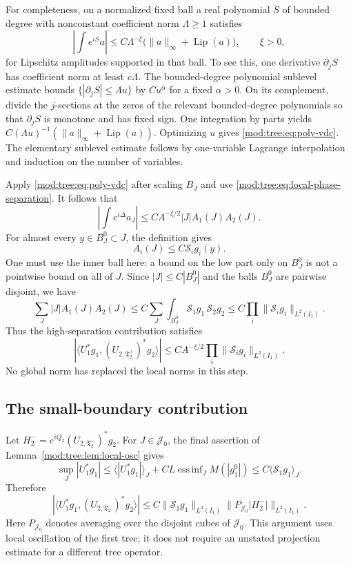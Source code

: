 \documentclass[11pt]{article}
\numberwithin{equation}{section}
\theoremstyle{remark}
\theoremstyle{definition}
\newcommand{\norm}[1]{\lVert #1\rVert}
\newcommand{\TT}{\mathfrak T}
\newcommand{\cJ}{\mathcal J}
\DeclareMathOperator*{\essinf}{ess\,inf}
\begin{document}
For completeness, on a normalized fixed ball a real polynomial $S$ of bounded degree with nonconstant coefficient norm $\Lambda\ge1$ satisfies
\begin{equation}\label{mod:tree:eq:poly-vdc}
 \left|\int e^{iS}a\right|
 \le C\Lambda^{-\xi}\bigl(\norm a_\infty+\operatorname{Lip}(a)\bigr),
 \qquad\xi>0,
\end{equation}
for Lipschitz amplitudes supported in that ball. To see this, one derivative $\partial_jS$ has coefficient norm at least $c\Lambda$. The bounded-degree polynomial sublevel estimate bounds $\{ |\partial_jS|\le\Lambda u\}$ by $Cu^\alpha$ for a fixed $\alpha>0$. On its complement, divide the $j$-sections at the zeros of the relevant bounded-degree polynomials so that $\partial_jS$ is monotone and has fixed sign. One integration by parts yields $C(\Lambda u)^{-1}(\norm a_\infty+\operatorname{Lip}(a))$. Optimizing $u$ gives \eqref{mod:tree:eq:poly-vdc}. The elementary sublevel estimate follows by one-variable Lagrange interpolation and induction on the number of variables.

Apply \eqref{mod:tree:eq:poly-vdc} after scaling $B_J$ and use \eqref{mod:tree:eq:local-phase-separation}. It follows that
\[
 \left|\int e^{i\Delta}a_J\right|
 \le CA^{-\xi/2}|J|A_1(J)A_2(J).
\]
For almost every $y\in B_J^0\subset J$, the definition gives
\[
 A_i(J)\le C\mathscr S_i g_i(y).
\]
One must use the inner ball here: a bound on the low part only on $B_J^0$ is not a pointwise bound on all of $J$. Since $|J|\le C|B_J^0|$ and the balls $B_J^0$ are pairwise disjoint, we have
\[
 \sum_J |J|A_1(J)A_2(J)
 \le C\sum_J\int_{B_J^0}\mathscr S_1g_1\,\mathscr S_2g_2
 \le C\prod_i\norm{\mathscr S_ig_i}_{L^2(I_1)}.
\]
Thus the high-separation contribution satisfies
\begin{equation}\label{mod:tree:eq:high-final}
 |\langle U_1^*g_1,(U_{2,\TT_2^+})^*g_2\rangle|
 \le CA^{-\xi/2}
 \prod_i\norm{\mathscr S_i g_i}_{L^2(I_1)}.
\end{equation}
No global norm has replaced the local norms in this step.

\subsection{The small-boundary contribution}
Let $H_2^-=e^{iQ_2}(U_{2,\TT_2^-})^*g_2$. For $J\in\cJ_0$, the final assertion of Lemma~\ref{mod:tree:lem:local-osc} gives
\[
 \sup_J|U_1^*g_1|
 \le \langle|U_1^*g_1|\rangle_J+CL\essinf_JM(|g_1^0|)
 \le C\langle\mathscr S_1g_1\rangle_J.
\]
Therefore
\begin{equation}\label{mod:tree:eq:near-pairing}
 |\langle U_1^*g_1,(U_{2,\TT_2^-})^*g_2\rangle|
 \le C\norm{\mathscr S_1g_1}_{L^2(I_1)}
 \norm{P_{\cJ_0}|H_2^-|}_{L^2(I_1)}.
\end{equation}
Here $P_{\cJ_0}$ denotes averaging over the disjoint cubes of $\cJ_0$. This argument uses local oscillation of the first tree; it does not require an unstated projection estimate for a different tree operator.
\end{document}
